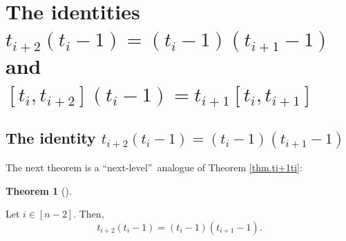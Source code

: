 \documentclass[numbers=enddot,12pt,final,onecolumn,notitlepage]{scrartcl}%
\theoremstyle{definition}
\newtheorem{theo}{Theorem}[section]
\newenvironment{theorem}[1][]
{\begin{theo}[#1]\begin{leftbar}}
{\end{leftbar}\end{theo}}
\begin{document}
\section{\label{sec.t3t1}The identities $t_{i+2}\left(  t_{i}-1\right)
=\left(  t_{i}-1\right)  \left(  t_{i+1}-1\right)  $ and $\left[
t_{i},t_{i+2}\right]  \left(  t_{i}-1\right)  =t_{i+1}\left[  t_{i}%
,t_{i+1}\right]  $}

\subsection{The identity $t_{i+2}\left(  t_{i}-1\right)  =\left(
t_{i}-1\right)  \left(  t_{i+1}-1\right)  $}

The next theorem is a \textquotedblleft next-level\textquotedblright\ analogue
of Theorem \ref{thm.ti+1ti}:

\begin{theorem}
\label{thm.ti+2ti}Let $i\in\left[  n-2\right]  $. Then,%
\[
t_{i+2}\left(  t_{i}-1\right)  =\left(  t_{i}-1\right)  \left(  t_{i+1}%
-1\right)  .
\]

\end{theorem}
\end{document}
